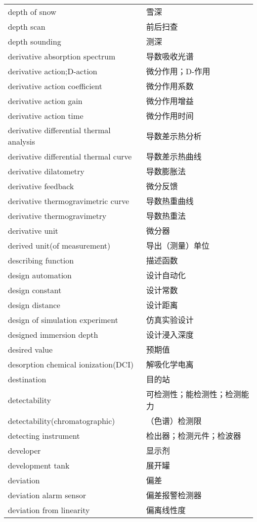 \documentclass[
]{article}
\begin{document}
\begin{longtable}[]{@{}ll@{}}
depth of snow & 雪深 \\
depth scan & 前后扫查 \\
depth sounding & 测深 \\
derivative absorption spectrum & 导数吸收光谱 \\
derivative action;D-action & 微分作用；D-作用 \\
derivative action coefficient & 微分作用系数 \\
derivative action gain & 微分作用增益 \\
derivative action time & 微分作用时间 \\
derivative differential thermal analysis & 导数差示热分析 \\
derivative differential thermal curve & 导数差示热曲线 \\
derivative dilatometry & 导数膨胀法 \\
derivative feedback & 微分反馈 \\
derivative thermogravimetric curve & 导数热重曲线 \\
derivative thermogravimetry & 导数热重法 \\
derivative unit & 微分器 \\
derived unit(of measurement) & 导出（测量）单位 \\
describing function & 描述函数 \\
design automation & 设计自动化 \\
design constant & 设计常数 \\
design distance & 设计距离 \\
design of simulation experiment & 仿真实验设计 \\
designed immersion depth & 设计浸入深度 \\
desired value & 预期值 \\
desorption chemical ionization(DCI) & 解吸化学电离 \\
destination & 目的站 \\
detectability & 可检测性；能检测性；检测能力 \\
detectability(chromatographic) & （色谱）检测限 \\
detecting instrument & 检出器；检测元件；检波器 \\
developer & 显示剂 \\
development tank & 展开罐 \\
deviation & 偏差 \\
deviation alarm sensor & 偏差报警检测器 \\
deviation from linearity & 偏离线性度 \\

\end{longtable}
\end{document}
